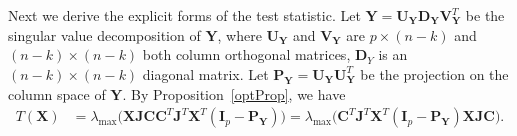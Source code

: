 \documentclass[12pt]{article} %
\newcommand{\bX}{\mathbf{X}}
\newcommand{\bP}{\mathbf{P}}
\newcommand{\bY}{\mathbf{Y}}
\newcommand{\bJ}{\mathbf{J}}
\newcommand{\bC}{\mathbf{C}}
\newcommand{\bI}{\mathbf{I}}
\newcommand{\bU}{\mathbf{U}}
\newcommand{\bD}{\mathbf{D}}
\newcommand{\bV}{\mathbf{V}}
\theoremstyle{definition}
\begin{document}
Next we derive the explicit forms of the test statistic. 
Let $\bY=\bU_{\bY}\bD_{\bY}\bV_{\bY}^T$ be the singular value decomposition of $\bY$, where $\bU_{\bY}$ and $\bV_{\bY}$ are $p\times (n-k)$ and $(n-k)\times(n-k)$ both column orthogonal matrices, $\bD_{Y}$ is an $(n-k)\times (n-k)$ diagonal matrix.
Let $\bP_{\bY}=\bU_{\bY}\bU_{\bY}^T$ be the projection on the column space of $\bY$.
By Proposition~\ref{optProp}, we have
\begin{equation}\label{statisticForm1}
\begin{aligned}
    T(\bX)&=\lambda_{\max}\big(\bX \bJ\bC\bC^T\bJ^T\bX^T (\bI_p-
    \bP_{\bY})
    \big)
    =\lambda_{\max}\big(\bC^T\bJ^T\bX^T (\bI_p-
    \bP_{\bY}
    )\bX\bJ\bC\big).
\end{aligned}
\end{equation}
\end{document}
